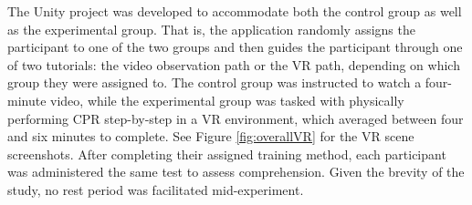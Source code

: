 \documentclass[manuscript]{./Models/acmart}
\begin{document}
The Unity project was developed to accommodate both the control group as well as the experimental group. That is, the application randomly assigns the participant to one of the two groups and then guides the participant through one of two tutorials: the video observation path or the VR path, depending on which group they were assigned to. The control group was instructed to watch a four-minute video, while the experimental group was tasked with physically performing CPR step-by-step in a VR environment, which averaged between four and six minutes to complete. See Figure \ref{fig:overallVR} for the VR scene screenshots. After completing their assigned training method, each participant was administered the same test to assess comprehension. Given the brevity of the study, no rest period was facilitated mid-experiment.
\end{document}
